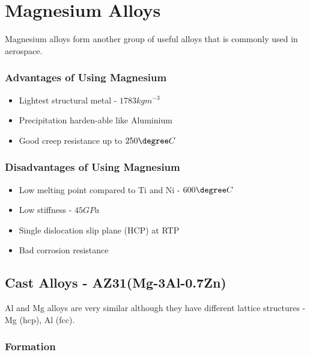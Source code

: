 \section{Magnesium Alloys} %
\label{sec:magnesium_alloys}

Magnesium alloys form another group of useful alloys that is commonly used in aerospace.

\subsubsection{Advantages of Using Magnesium} %
\label{ssub:advantages}

\begin{itemize}
  \item Lightest structural metal - $1783 kg m^{-3}$
  \item Precipitation harden-able like Aluminium
  \item Good creep resistance up to $250\degree C$
\end{itemize}

\subsubsection{Disadvantages of Using Magnesium} %
\label{ssub:disadvantages_of_using_magnesium}

\begin{itemize}
  \item Low melting point compared to Ti and Ni - $600\degree C$
  \item Low stiffness - $45GPa$
  \item Single dislocation slip plane (HCP) at RTP
  \item Bad corrosion resistance
\end{itemize}

\subsection{Cast Alloys - AZ31(Mg-3Al-0.7Zn)} %
\label{sub:az31}

Al and Mg alloys are very similar although they have different lattice structures - Mg (hcp), Al (fcc).

\subsubsection{Formation} %
\label{ssub:formation}


